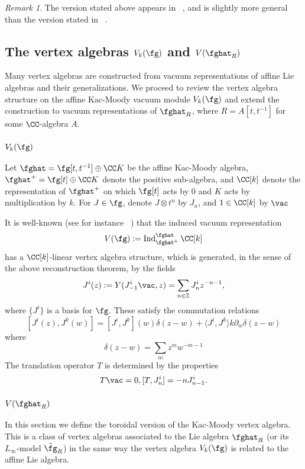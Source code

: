 \documentclass[12pt]{amsart}
\theoremstyle{definition}
\theoremstyle{remark}
\newtheorem{rmk}[theorem]{Remark}
\newcommand{\on}{\operatorname}
\newcommand{\R}{R}
\begin{document}
\begin{rmk}
The version stated above appears in ~\cite{DSK}, and is slightly more general than the version stated in ~\cite{FBZ}. 
\end{rmk}

\subsection{The vertex algebras $V_{k}(\fg)$ and $V(\fghat_{\R})$}

Many vertex algebras are constructed from vacuum representations of affine Lie algebras and their generalizations. We proceed to review the vertex algebra structure on the affine Kac-Moody vacuum module $V_{k}(\fg)$ and extend the construction to vacuum representations of $\fghat_{R}$, where $R=A[t,t^{-1}]$ for some $\CC$-algebra $A$.

\subsubsection{$V_{k}(\fg)$}
Let $\fghat = \fg[t,t^{-1}] \oplus \CC K$ be the affine Kac-Moody algebra, $\fghat^{+} = \fg[t] \oplus \CC K$ denote the positive sub-algebra, and $\CC[k]$ denote the representation of $\fghat^{+}$ on which $\fg[t]$ acts by $0$ and $K$ acts by multiplication by $k$.
For $J \in \fg$, denote $J \otimes t^n$ by $J_n$, and $1 \in \CC[k]$ by $\vac$

It is well-known (see for instance ~\cite{FBZ}) that the induced vacuum representation
\[
V (\fg) := \on{Ind}^{\fghat}_{\fghat^+} \CC[k]
\] 
has a $\CC[k]$-linear vertex algebra structure, which is generated, in the sense of the above reconstruction theorem, by the fields
\[
J^i (z) := Y(J^{i}_{-1} \vac, z) = \sum_{n \in \mathbb{Z}} J^i_n z^{-n-1},
\]
where $\{ J^{i} \}$ is a basis for $\fg$. These satisfy the commutation relations
\[
[J^i(z), J^{k}(w)] = [J^{i}, J^{k}](w) \delta(z-w) +  \langle J^{i}, J^{k} \rangle k \partial_w \delta(z-w)
\]
where 
\[
\delta(z-w) = \sum_{m} z^{m} w^{-m-1} 
\]
The translation operator $T$ is determined by the properties
\[
T \vac =0, [T, J^i_n] = -n J^{i}_{n-1}.
\]


\subsubsection{$V(\fghat_{\R})$}

In this section we define the toroidal version of the Kac-Moody vertex algebra.
This is a class of vertex algebras associated to the Lie algebra $\fghat_R$ (or its $L_\infty$-model $\Tilde{\fg}_R$) in the same way the vertex algebra $V_k(\fg)$ is related to the affine Lie algebra.
\end{document}
